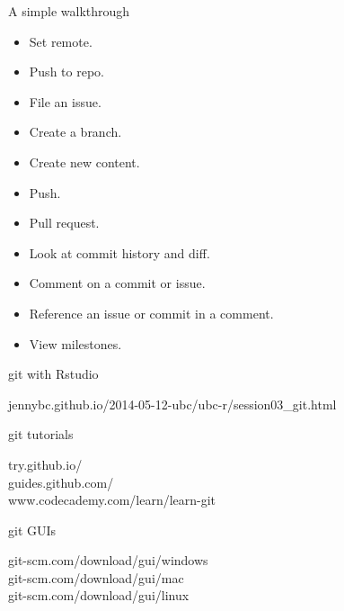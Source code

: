 \documentclass[12pt]{beamer}
\begin{document}
\begin{frame}

	\begin{flushright}
  	\Large \textcolor{boss2}{A simple walkthrough} 
	\end{flushright}

	\begin{itemize}
		\item Set remote. 
		\item Push to repo. 
		\item File an issue.  
		\item Create a branch. 
		\item Create new content. 
		\item Push. 
		\item Pull request. 
		\item Look at commit history and diff. 
		\item Comment on a commit or issue. 
		\item Reference an issue or commit in a comment. 
		\item View milestones.  
	\end{itemize}

\end{frame}















\begin{frame}

	\begin{flushright}
		{\Large \textcolor{boss2}{git with Rstudio}} \\
	\end{flushright}
		jennybc.github.io/2014-05-12-ubc/ubc-r/session03\_git.html \\
		\bigskip
	\begin{flushright}
		{\Large \textcolor{boss2}{git tutorials}} \\
	\end{flushright}
		try.github.io/ \\
		guides.github.com/ \\
		www.codecademy.com/learn/learn-git \\
		\bigskip
	\begin{flushright}
		{\Large \textcolor{boss2}{git GUIs}} \\
	\end{flushright}
		git-scm.com/download/gui/windows	\\
		git-scm.com/download/gui/mac \\
		git-scm.com/download/gui/linux \\
\end{frame}
\end{document}
